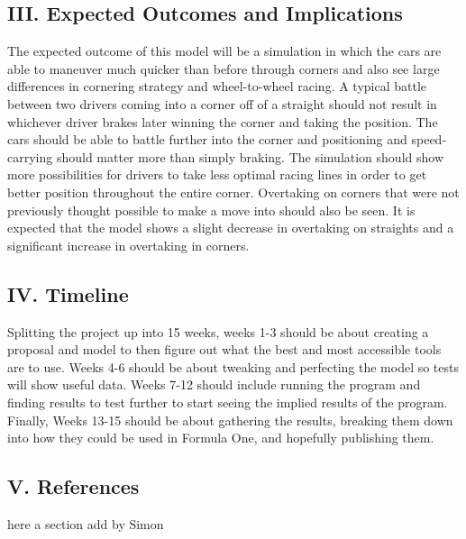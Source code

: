 \documentclass[11pt]{article} %
\begin{document}
\subsection{III. Expected Outcomes and Implications}

The expected outcome of this model will be a simulation in which the cars are able to maneuver much quicker than before through corners and also see large differences in cornering strategy and wheel-to-wheel racing. A typical battle between two drivers coming into a corner off of a straight should not result in whichever driver brakes later winning the corner and taking the position. The cars should be able to battle further into the corner and positioning and speed-carrying should matter more than simply braking. The simulation should show more possibilities for drivers to take less optimal racing lines in order to get better position throughout the entire corner. Overtaking on corners that were not previously thought possible to make a move into should also be seen. It is expected that the model shows a slight decrease in overtaking on straights and a significant increase in overtaking in corners.

\subsection {IV. Timeline}

Splitting the project up into 15 weeks, weeks 1-3 should be about creating a proposal and model to then figure out what the best and most accessible tools are to use. Weeks 4-6 should be about tweaking and perfecting the model so tests will show useful data. Weeks 7-12 should include running the program and finding results to test further to start seeing the implied results of the program. Finally, Weeks 13-15 should be about gathering the results, breaking them down into how they could be used in Formula One, and hopefully publishing them.

\subsection {V. References}


here a section add by Simon
\end{document}
